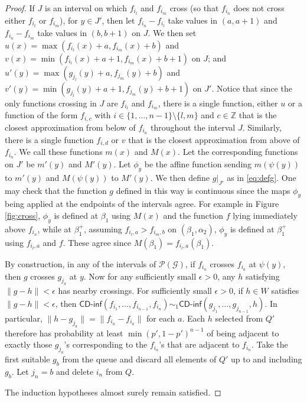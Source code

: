 \documentclass{daj}
\newcommand{\Z}{\mathbb Z}
\newcommand{\cdinf}{\textsf{CD-inf}}
\begin{document}
\begin{proof}
If $J$ is an interval on which $f_{i_l}$ and $f_{i_m}$ cross (so that $f_{i_n}$ does not cross either
$f_{i_l}$ or $f_{i_m}$), for $y\in J'$, then let $f_{i_n}-f_{i_l}$ take
values in $(a,a+1)$ and $f_{i_n}-f_{i_m}$ take values in $(b,b+1)$ on $J$.
We then set $u(x)=\max(f_{i_l}(x)+a,f_{i_m}(x)+b)$ and
$v(x)=\min(f_{i_l}(x)+a+1,f_{i_m}(x)+b+1)$ on $J$; and
$u'(y)=\max(g_{j_l}(y)+a,f_{j_m}(y)+b)$ and $v'(y)=\min(g_{j_l}(y)+a+1,f_{j_m}(y)+b+1)$ on $J'$.
Notice that since the only functions crossing in $J$ are $f_{i_l}$ and $f_{i_m}$,
there is a single function, either $u$ or a function of the form $f_{i,c}$ with
$i\in\{1,\ldots,n-1\}\setminus\{l,m\}$ and $c\in\Z$ that is
the closest approximation from below of $f_{i_n}$ throughout the interval $J$.
Similarly, there is a single function
$f_{i,d}$ or $v$ that is the closest approximation from above of $f_{i_n}$.
We call these functions $m(x)$ and $M(x)$.
Let the corresponding functions on $J'$ be $m'(y)$ and $M'(y)$.
Let $\phi_y$ be the affine function sending
$m(\psi(y))$ to $m'(y)$ and $M(\psi(y))$ to $M'(y)$. We then define $g|_{J'}$ as in \eqref{eq:defg}.
One may check that the function $g$ defined in this way is continuous since the maps $\phi_y$ being applied
at the endpoints of the intervals agree. For example in Figure \ref{fig:cross},
$\phi_y$ is defined at $\beta_1$
using $M(x)$ and the function $f$ lying immediately above $f_{i_n}$, while at $\beta_1^+$,
assuming $f_{i_l,a}>f_{i_m,b}$ on $(\beta_1,\alpha_2)$, $\phi_y$ is defined
at $\beta_1^+$ using $f_{i_l,a}$ and $f$.
These agree since $M(\beta_1)=f_{i_l,a}(\beta_1)$.

By construction, in any of the intervals of $\mathcal P(\mathcal G)$,
if $f_{i_n}$ crosses $f_{i_a}$ at $\psi(y)$, then $g$ crosses $g_{j_a}$ at $y$.
Now for any sufficiently small $\epsilon>0$, any $h$ satisfying $\|g-h\|<\epsilon$ has nearby crossings.
For sufficiently small $\epsilon>0$, if $h\in W$ satisfies $\|g-h\|<\epsilon$,
then $\cdinf(f_{i_1},\ldots,f_{i_{n-1}},f_{i_n})\sim_1 \cdinf(g_{j_1},\ldots,g_{j_{n-1}},h)$.
In particular, $\|h-g_{j_a}\|=\|f_{i_n}-f_{i_a}\|$ for each $a$. Each $h$ selected from $Q'$
therefore has probability at least $\min(p',1-p')^{n-1}$ of being adjacent to exactly those $g_{j_a}$'s
corresponding to the $f_{i_a}$'s that are adjacent to $f_{i_n}$. Take the first suitable $g_b$ from the queue
and discard all elements of $Q'$ up to and including $g_b$. Let $j_n=b$ and delete $i_n$ from $Q$.

The induction hypotheses almost surely remain satisfied.
\end{proof}
\end{document}
